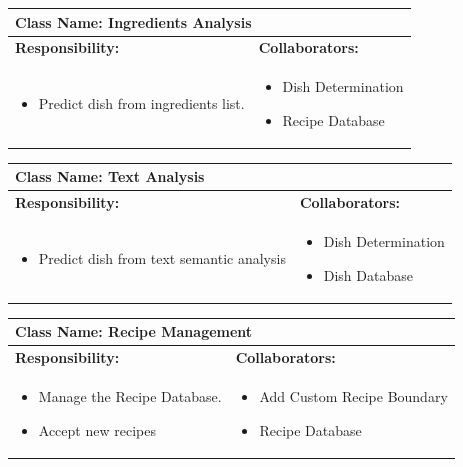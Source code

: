 \documentclass[]{article}
\begin{document}
\begin{table}[H]
	\centering
	\begin{tabular}{|p{7cm}|p{7cm}|}
	\hline 
	 \multicolumn{2}{|l|}{\textbf{Class Name: Ingredients Analysis}} \\
	\hline
	\textbf{Responsibility:} & \textbf{Collaborators:} \\
	\hline
	\raggedright
	\begin{itemize}
		\item Predict dish from ingredients list.
	\end{itemize}
	\vspace{1in} & 
	\begin{itemize}
		\item Dish Determination
		\item Recipe Database
	\end{itemize} \\
	\hline
	\end{tabular}
\end{table}

\begin{table}[H]
	\centering
	\begin{tabular}{|p{7cm}|p{7cm}|}
	\hline 
	 \multicolumn{2}{|l|}{\textbf{Class Name: Text Analysis}} \\
	\hline
	\textbf{Responsibility:} & \textbf{Collaborators:} \\
	\hline
	\raggedright
	\begin{itemize}
		\item Predict dish from text semantic analysis
	\end{itemize}
	\vspace{1in} & 
	\begin{itemize}
		\item Dish Determination
		\item Dish Database
	\end{itemize} \\
	\hline
	\end{tabular}
\end{table}

\begin{table}[H]
	\centering
	\begin{tabular}{|p{7cm}|p{7cm}|}
	\hline 
	 \multicolumn{2}{|l|}{\textbf{Class Name: Recipe Management}} \\
	\hline
	\textbf{Responsibility:} & \textbf{Collaborators:} \\
	\hline
	\raggedright
	\begin{itemize}
		\item Manage the Recipe Database.
		\item Accept new recipes
	\end{itemize}
	\vspace{1in} & 
	\begin{itemize}
		\item Add Custom Recipe Boundary
		\item Recipe Database
	\end{itemize} \\
	\hline
	\end{tabular}
\end{table}
\end{document}
